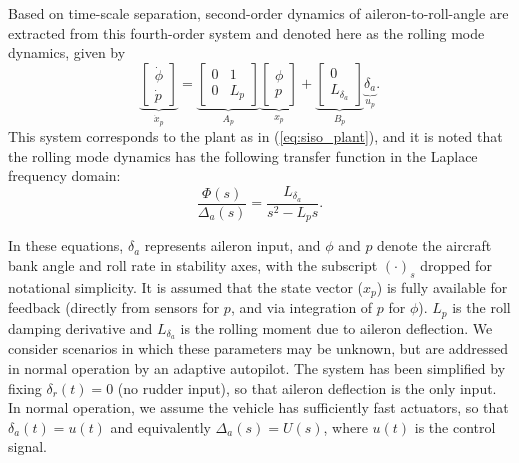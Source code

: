 Based on time-scale separation, second-order dynamics of aileron-to-roll-angle are extracted from this fourth-order system and denoted here as the rolling mode dynamics, given by
\begin{equation}
	\underbrace{\begin{bmatrix}
			\dot{\phi} \\ \dot{p}
		\end{bmatrix}}_{\dot{x}_p} = \underbrace{\begin{bmatrix}
			0 & 1 \\ 0 & L_p
		\end{bmatrix}}_{A_p} \underbrace{\begin{bmatrix}
			\phi \\ p
		\end{bmatrix}}_{x_p} + \underbrace{\begin{bmatrix}
			0 \\ L_{\delta_a}
		\end{bmatrix}}_{B_p} \underbrace{\delta_a}_{u_p}.
	\label{eqn:2nd_order_lateral}
\end{equation}
This system corresponds to the plant as in (\ref{eq:siso_plant}), and it is noted that the rolling mode dynamics has the following transfer function in the Laplace frequency domain:
\begin{equation}
		\frac{\Phi(s)}{\Delta_a(s)} = \frac{L_{\delta_a}}{s^2 - L_p s}.
\end{equation}

In these equations, $\delta_a$ represents aileron input, and $\phi$ and $p$ denote the aircraft bank angle and roll rate in stability axes, with the subscript $(\cdot)_s$ dropped for notational simplicity. It is assumed that the state vector ($x_p$) is fully available for feedback (directly from sensors for $p$, and via integration of $p$ for $\phi$). $L_p$ is the roll damping derivative and $L_{\delta_a}$ is the rolling moment due to aileron deflection. We consider scenarios in which these parameters may be unknown, but are addressed in normal operation by an adaptive autopilot. The system has been simplified by fixing $\delta_r(t) = 0$ (no rudder input), so that aileron deflection is the only input. In normal operation, we assume the vehicle has sufficiently fast actuators, so that $\delta_a(t) = u(t)$ and equivalently $\Delta_a(s) = U(s)$, where $u(t)$ is the control signal. 


